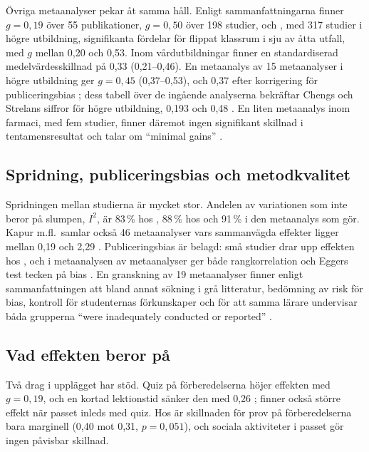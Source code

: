 Övriga metaanalyser pekar åt samma håll. Enligt sammanfattningarna finner
\textcite{Cheng2019} \(g = 0{,}19\) över 55 publikationer,
\textcite{Strelan2020} \(g = 0{,}50\) över 198 studier, och
\textcite{Bredow2021}, med 317 studier i högre utbildning, signifikanta
fördelar för flippat klassrum i sju av åtta utfall, med \(g\) mellan 0,20
och 0,53. Inom vårdutbildningar finner \textcite{HewLo2018} en
standardiserad medelvärdesskillnad på 0,33 (0,21--0,46). En metaanalys av
15 metaanalyser i högre utbildning ger \(g = 0{,}45\) (0,37--0,53), och
0,37 efter korrigering för publiceringsbias
\parencite[140--141]{Hew2021second}; dess tabell över de ingående
analyserna bekräftar Chengs och Strelans siffror för högre utbildning,
0,193 och 0,48 \parencite[136]{Hew2021second}. En liten metaanalys inom
farmaci, med fem studier, finner däremot ingen signifikant skillnad i
tentamensresultat och talar om \enquote{minimal gains}
\parencite{Gillette2018}.

\subsection{Spridning, publiceringsbias och metodkvalitet}

Spridningen mellan studierna är mycket stor. Andelen av variationen som
inte beror på slumpen, \(I^2\), är 83\,\% hos
\textcite[7]{LagSaele2019}, 88\,\% hos \textcite[tabell~3,
s.~10]{vanAlten2019} och 91\,\% i den metaanalys som
\textcite[7]{Kapur2022} gör. Kapur m.fl.\ samlar också 46 metaanalyser vars sammanvägda effekter
ligger mellan 0,19 och 2,29 \parencite[2]{Kapur2022}. Publiceringsbias är
belagd: små studier drar upp effekten hos \textcite[9]{LagSaele2019},
och i
metaanalysen av metaanalyser ger både rangkorrelation och Eggers test
tecken på bias \parencite[141]{Hew2021second}. En granskning av 19
metaanalyser finner enligt sammanfattningen att bland annat sökning i grå
litteratur, bedömning av risk för bias, kontroll för studenternas
förkunskaper och för att samma lärare undervisar båda grupperna
\enquote{were inadequately conducted or reported}
\parencite{Hew2021methodology}.

\subsection{Vad effekten beror på}

Två drag i upplägget har stöd. Quiz på förberedelserna höjer effekten med
\(g = 0{,}19\), och en kortad lektionstid sänker den med 0,26
\parencite[9]{vanAlten2019}; \textcite{HewLo2018} finner också större
effekt när passet inleds med quiz. Hos \textcite[7]{LagSaele2019} är
skillnaden för prov på förberedelserna bara marginell (0,40 mot 0,31,
\(p = 0{,}051\)), och sociala aktiviteter i passet gör ingen påvisbar
skillnad.

